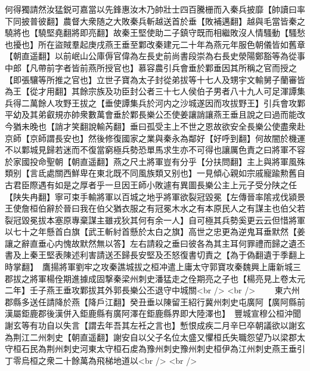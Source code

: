 何得獨請然汝猛鋭可嘉當以先鋒惠汝木乃帥壯士四百騰栅而入秦兵披靡【帥讀曰率下同披普彼翻】農督大衆随之大敗秦兵斬越送首於垂【敗補邁翻】越與毛當皆秦之驍將也【驍堅堯翻將即亮翻】故秦王堅使助二子鎮守既而相繼敗沒人情騷動【騷愁也擾也】所在盜賊羣起庚戌燕王垂至鄴改秦建元二十年為燕元年服色朝儀皆如舊章【朝直遥翻】以前岷山公庫傉官偉為左長史前尚書段崇為右長史滎陽鄭豁等為從事中郎【凡帶前字者皆前燕所授官也】慕容農引兵會垂於鄴垂因其所稱之官而授之【即張驤等所推之官也】立世子寶為太子封從弟拔等十七人及甥宇文輸舅子蘭審皆為王【從才用翻】其餘宗族及功臣封公者三十七人侯伯子男者八十九人可足渾譚集兵得二萬餘人攻野王拔之【垂使譚集兵於河内之沙城遂因而攻拔野王】引兵會攻鄴平幼及其弟叡規亦帥衆數萬會垂於鄴長樂公丕使姜讓誚讓燕王垂且說之曰過而能改今猶未晚也【誚才笑翻說輸芮翻】垂曰孤受主上不世之恩故欲安全長樂公使盡衆赴京師【京師謂長安也】然後修復國家之業與秦永為鄰好【好呼到翻】何故闇於機運不以鄴城見歸若迷而不復當窮極兵勢恐單馬求生亦不可得也讓厲色責之曰將軍不容於家國投命聖朝【朝直遥翻】燕之尺土將軍豈有分乎【分扶問翻】主上與將軍風殊類别【言氐處關西鮮卑在東北既不同風族類又别也】一見傾心親如宗戚寵踰勲舊自古君臣際遇有如是之厚者乎一旦因王師小敗遽有異圖長樂公主上元子受分陕之任【陕失冉翻】寧可束手輸將軍以百城之地乎將軍欲裂冠毀冕【左傳晉率隂戎伐潁景王使詹桓伯辭於晉曰我在伯父猶衣服之有冠冕木水之有本原民人之有謀主也伯父若裂冠毀冕拔本塞原專棄謀主雖戎狄其何有余一人】自可極其兵勢奚更云云但惜將軍以七十之年懸首白旗【武王斬紂首懸於太白之旗】高世之忠更為逆鬼耳垂默然【姜讓之辭直垂心内愧故默然無以答】左右請殺之垂曰彼各為其主耳何罪禮而歸之遺丕書及上秦王堅表陳述利害請送丕歸長安堅及丕怒復書切責之【為于偽翻遺于季翻上時掌翻】　鷹揚將軍劉牢之攻秦譙城拔之桓冲遣上庸太守郭寶攻秦魏興上庸新城三郡拔之將軍楊佺期進據成固撃秦梁州刺史潘猛走之佺期亮之子也【楊亮見上卷太元二年】壬子燕王垂攻鄴拔其外郭長樂公丕退守中城關<br />
<br />
　　東六州郡縣多送任請降於燕【降戶江翻】癸丑垂以陳留王紹行冀州刺史屯廣阿【廣阿縣前漢屬鉅鹿郡後漢併入鉅鹿縣有廣阿澤在鉅鹿縣界即大陸澤也】　豐城宣穆公桓沖聞謝玄等有功自以失言【謂去年吾其左衽之言也】慙恨成疾二月辛巳卒朝議欲以謝玄為荆江二州刺史【朝直遥翻】謝安自以父子名位太盛又懼桓氏失職怨望乃以梁郡太守桓石民為荆州刺史河東太守桓石䖍為豫州刺史豫州刺史桓伊為江州刺史燕王垂引丁零烏桓之衆二十餘萬為飛梯地道以<br />
<br />
